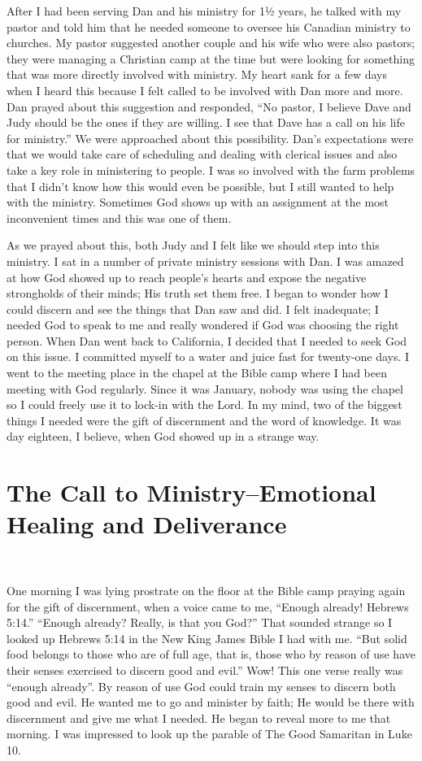 \documentclass[oneside]{book}
\begin{document}
After I had been serving Dan and his ministry for 1½ years, he talked with my pastor and told him that he needed someone to oversee his Canadian ministry to churches. My pastor suggested another couple and his wife who were also pastors; they were managing a Christian camp at the time but were looking for something that was more directly involved with ministry. My heart sank for a few days when I heard this because I felt called to be involved with Dan more and more. Dan prayed about this suggestion and responded, “No pastor, I believe Dave and Judy should be the ones if they are willing. I see that Dave has a call on his life for ministry.” We were approached about this possibility. Dan's expectations were that we would take care of scheduling and dealing with clerical issues and also take a key role in ministering to people. I was so involved with the farm problems that I didn't know how this would even be possible, but I still wanted to help with the ministry. Sometimes God shows up with an assignment at the most inconvenient times and this was one of them.


As we prayed about this, both Judy and I felt like we should step into this ministry. I sat in a number of private ministry sessions with Dan. I was amazed at how God showed up to reach people’s hearts and expose the negative strongholds of their minds; His truth set them free. I began to wonder how I could discern and see the things that Dan saw and did. I felt inadequate; I needed God to speak to me and really wondered if God was choosing the right person. When Dan went back to California, I decided that I needed to seek God on this issue. I committed myself to a water and juice fast for twenty-one days. I went to the meeting place in the chapel at the Bible camp where I had been meeting with God regularly. Since it was January, nobody was using the chapel so I could freely use it to lock-in with the Lord. In my mind, two of the biggest things I needed were the gift of discernment and the word of knowledge. It was day eighteen, I believe, when God showed up in a strange way.


\section{The Call to Ministry--Emotional Healing and Deliverance}
\

One morning I was lying prostrate on the floor at the Bible camp praying again for the gift of discernment, when a voice came to me, “Enough already! Hebrews 5:14.” “Enough already? Really, is that you God?” That sounded strange so I looked up Hebrews 5:14 in the New King James Bible I had with me. “But solid food belongs to those who are of full age, that is, those who by reason of use have their senses exercised to discern good and evil.” Wow! This one verse really was “enough already”. By reason of use God could train my senses to discern both good and evil. He wanted me to go and minister by faith; He would be there with discernment and give me what I needed. He began to reveal more to me that morning. I was impressed to look up the parable of The Good Samaritan in Luke 10.
\end{document}
